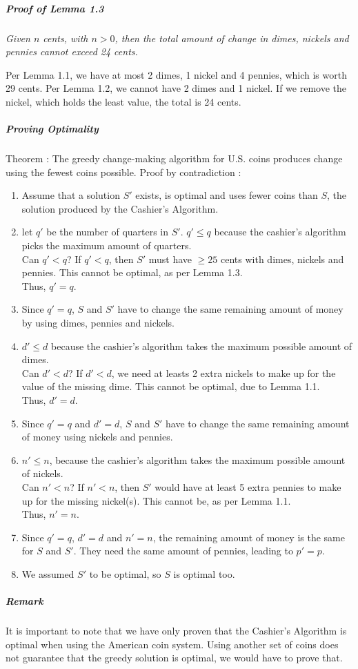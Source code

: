 \documentclass[10pt,a4paper]{book}
\begin{document}
\subparagraph*{Proof of Lemma 1.3}
\textit{Given $n$ cents, with $n > 0$, then the total amount of change in dimes, nickels and pennies cannot exceed 24 cents.}\par
Per Lemma 1.1, we have at most 2 dimes, 1 nickel and 4 pennies, which is worth 29 cents. Per Lemma 1.2, we cannot have 2 dimes and 1 nickel. If we remove the nickel, which holds the least value, the total is 24 cents.
\subparagraph*{Proving Optimality}
Theorem : The greedy change-making algorithm for U.S. coins produces change using the fewest coins possible.
Proof by contradiction :
\begin{enumerate}
\item Assume that a solution $S'$ exists, is optimal and uses fewer coins than $S$, the solution produced by the Cashier's Algorithm.
\item let $q'$ be the number of quarters in $S'$. $q' \leqslant q$ because the cashier's algorithm picks the maximum amount of quarters.\\
Can $q' < q$? If $q' < q$, then $S'$ must have $\geqslant 25$ cents with dimes, nickels and pennies. This cannot be optimal, as per Lemma 1.3.\\
Thus, $q' = q$.
\item Since $q' = q$, $S$ and $S'$ have to change the same remaining amount of money by using dimes, pennies and nickels.
\item $d' \leqslant d$ because the cashier's algorithm takes the maximum possible amount of dimes.\\
Can $d' < d$? If $d' < d$, we need at leasts 2 extra nickels to make up for the value of the missing dime. This cannot be optimal, due to Lemma 1.1.\\
Thus, $d' = d$.
\item Since $q' = q$ and $d' = d$, $S$ and $S'$ have to change the same remaining amount of money using nickels and pennies.
\item $n' \leqslant n$, because the cashier's algorithm takes the maximum possible amount of nickels.\\
Can $n' < n$? If $n' < n$, then $S'$ would have at least 5 extra pennies to make up for the missing nickel(s). This cannot be, as per Lemma 1.1.\\
Thus, $n' = n$.
\item Since $q' = q$, $d' = d$ and $n' = n$, the remaining amount of money is the same for $S$ and $S'$. They need the same amount of pennies, leading to $p' = p$.
\item We assumed $S'$ to be optimal, so $S$ is optimal too.
\end{enumerate}
\subparagraph*{Remark}
It is important to note that we have only proven that the Cashier's Algorithm is optimal when using the American coin system. Using another set of coins does not guarantee that the greedy solution is optimal, we would have to prove that. 
\end{document}

